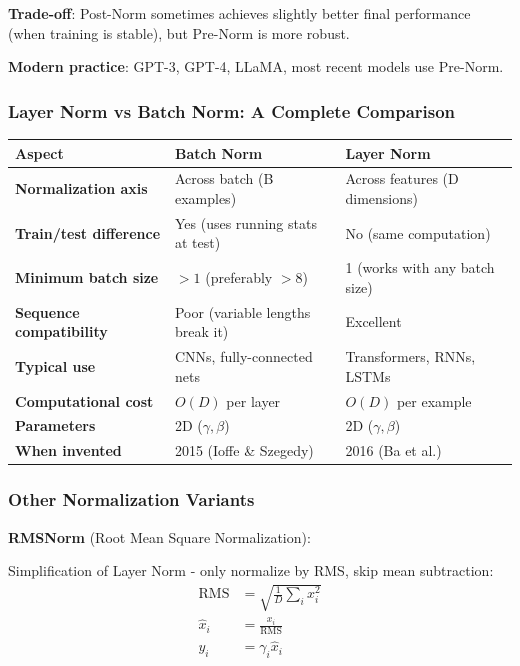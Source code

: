 \documentclass[11pt,oneside]{book}
\begin{document}
\textbf{Trade-off}: Post-Norm sometimes achieves slightly better final performance (when training is stable), but Pre-Norm is more robust.

\textbf{Modern practice}: GPT-3, GPT-4, LLaMA, most recent models use Pre-Norm.

\subsubsection{Layer Norm vs Batch Norm: A Complete Comparison}

\begin{center}
\begin{tabular}{lll}
\hline
\textbf{Aspect} & \textbf{Batch Norm} & \textbf{Layer Norm} \\
\hline
\textbf{Normalization axis} & Across batch (B examples) & Across features (D dimensions) \\
\textbf{Train/test difference} & Yes (uses running stats at test) & No (same computation) \\
\textbf{Minimum batch size} & $>1$ (preferably $>8$) & 1 (works with any batch size) \\
\textbf{Sequence compatibility} & Poor (variable lengths break it) & Excellent \\
\textbf{Typical use} & CNNs, fully-connected nets & Transformers, RNNs, LSTMs \\
\textbf{Computational cost} & $O(D)$ per layer & $O(D)$ per example \\
\textbf{Parameters} & 2D ($\gamma, \beta$) & 2D ($\gamma, \beta$) \\
\textbf{When invented} & 2015 (Ioffe \& Szegedy) & 2016 (Ba et al.) \\
\hline
\end{tabular}
\end{center}

\subsubsection{Other Normalization Variants}

\textbf{RMSNorm} (Root Mean Square Normalization):

Simplification of Layer Norm - only normalize by RMS, skip mean subtraction:
\begin{align*}
\text{RMS} &= \sqrt{\frac{1}{D} \sum_i x_i^2} \\
\hat{x}_i &= \frac{x_i}{\text{RMS}} \\
y_i &= \gamma_i \hat{x}_i
\end{align*}
\end{document}
